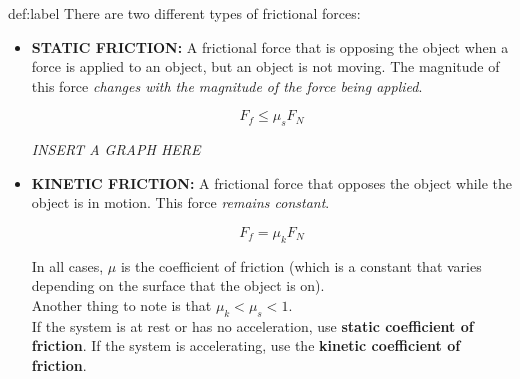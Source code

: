 	
\begin{definition}{def:label}
	There are two different types of frictional forces:

	\begin{itemize}
		\item \textbf{STATIC FRICTION:} A frictional force that is opposing the object when a force is applied to an object, but an object is not moving. The magnitude of this force \textit{changes with the magnitude of the force being applied}.
		
		$$F_{f} \le \mu_s F_N$$

		\textit{INSERT A GRAPH HERE}

		\item \textbf{KINETIC FRICTION:} A frictional force that opposes the object while the object is in motion. This force \textit{remains constant}.
		
		$$F_{f} = \mu_k F_N$$

		In all cases, $\mu$ is the coefficient of friction (which is a constant that varies depending on the surface that the object is on).\\

		Another thing to note is that $\mu_k < \mu_s < 1$.\\

		If the system is at rest or has no acceleration, use \textbf{static coefficient of friction}. If the system is accelerating, use the \textbf{kinetic coefficient of friction}.
	\end{itemize}
\end{definition}


